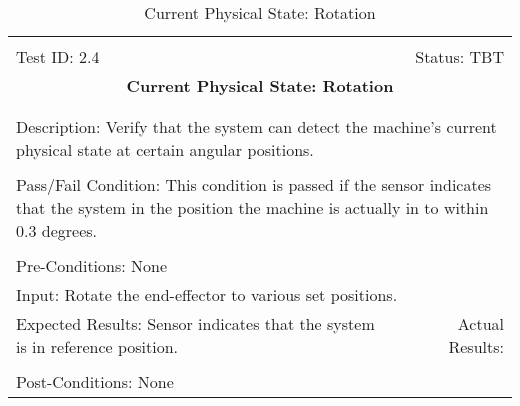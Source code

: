 \documentclass[titlepage]{article}
\begin{document}
\begin{center}%
\begin{table}[h!]
\begin{tabular}{|l r|}\hline&\\[-2mm]
	Test ID: 2.4	&Status: TBT\\[-3mm]
	\multicolumn{2}{|c|}{\textbf{\large{Current Physical State: Rotation}}}\\&\\\hline&\\[-3mm]
	\multicolumn{2}{|p{\textwidth}|}{Description: Verify that the system can detect the machine's current physical state at certain angular positions.}\\[1mm]\hline&\\[-3mm]
	\multicolumn{2}{|p{\textwidth}|}{Pass/Fail Condition: This condition is passed if the sensor indicates that the system in the position the machine is actually in to within 0.3 degrees.}\\[1mm]\hline&\\[-3mm]
	\multicolumn{2}{|p{\textwidth}|}{Pre-Conditions: None}\\[4mm]
	\multicolumn{2}{|p{\textwidth}|}{Input: Rotate the end-effector to various set positions.}\\[2mm]\hline
	\multicolumn{1}{|p{0.49\textwidth}}{Expected Results: Sensor indicates that the system is in reference position.}	&\multicolumn{1}{|p{0.45\textwidth}|}{Actual Results:}\\\hline&\\[-3mm]
	\multicolumn{2}{|p{\textwidth}|}{Post-Conditions: None}\\\hline
\end{tabular}
\caption{Current Physical State: Rotation}
\end{table}
\end{center}
\end{document}
